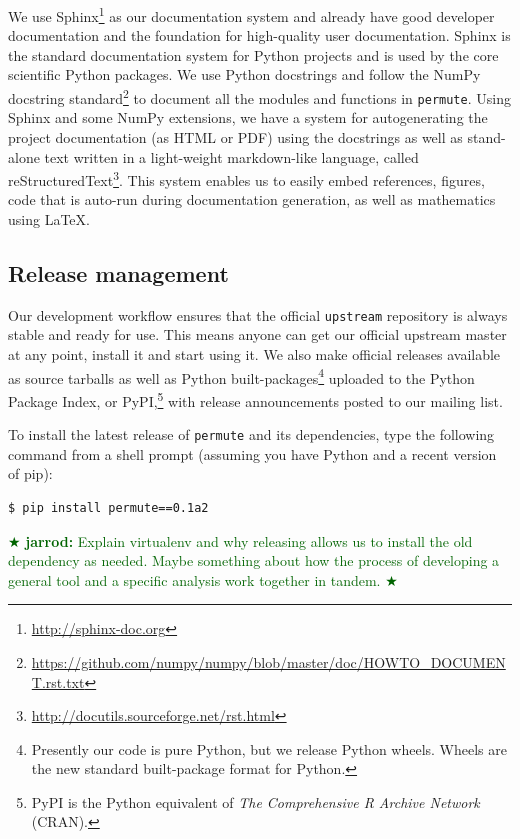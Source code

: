 \documentclass[]{article}
\newcommand{\jarrod}[1] { \textcolor{darkgreen} {
\ensuremath{\bigstar} {\bf jarrod:}  {#1}
\ensuremath{\bigstar} } }
\begin{document}
We use Sphinx\footnote{
   \url{http://sphinx-doc.org}
} 
as our documentation system
and already have good developer documentation and the foundation for
high-quality user documentation.
Sphinx is the standard documentation system for Python projects and is used by
the core scientific Python packages.
We use Python docstrings and follow the NumPy docstring
standard\footnote{
   \url{https://github.com/numpy/numpy/blob/master/doc/HOWTO\_DOCUMENT.rst.txt}
}
to document all the modules and functions in \texttt{permute}.
Using Sphinx and some NumPy extensions, we have a system for autogenerating the
project documentation (as HTML or PDF) using the docstrings as well as
stand-alone text written in a light-weight markdown-like language, called
reStructuredText\footnote{\url{http://docutils.sourceforge.net/rst.html}}.
This system enables us to easily embed references, figures, code that is
auto-run during documentation generation, as well as mathematics using \LaTeX.

\subsection{\label{sec:release}Release management}

Our development workflow ensures that the official \texttt{upstream} repository
is always stable and ready for use.
This means anyone can get our official upstream master at any point, install it
and start using it.
We also make official releases available as source tarballs as well as Python
built-packages\footnote{Presently our code is pure Python, but we release
Python wheels.
Wheels are the new standard built-package format for Python.} uploaded to the
Python Package Index, or PyPI,\footnote{PyPI is the Python equivalent of \emph{The
Comprehensive R Archive Network} (CRAN).} with release announcements posted to
our mailing list.

To install the latest release of \texttt{permute} and its dependencies, type
the following command from a shell prompt (assuming you have Python and a
recent version of pip):
\begin{verbatim}
$ pip install permute==0.1a2
\end{verbatim}
\jarrod{Explain virtualenv and why releasing allows us to install the
old dependency as needed.
Maybe something about how the process of developing a general tool and a
specific analysis work together in tandem.}



\end{document}
